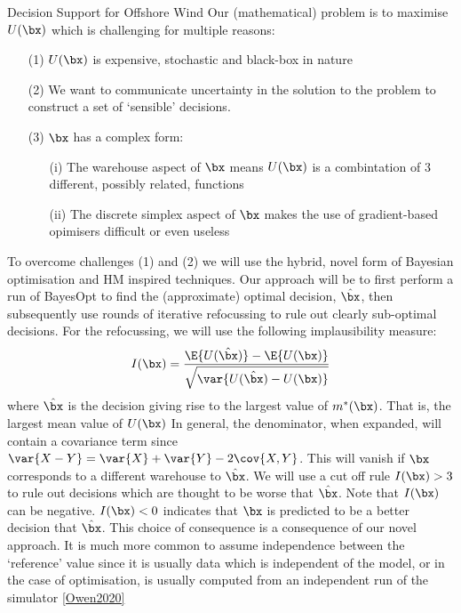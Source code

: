 \begin{chapter}{Decision Support for Offshore Wind \label{Ch:ds-for-ow}}
Our (mathematical) problem is to maximise $U(\bx)$ which is challenging for multiple reasons:
\begin{itemize}
  \item[(1)] $U(\bx)$ is expensive, stochastic and black-box in nature
  \item[(2)] We want to communicate uncertainty in the solution to the problem to construct a set of `sensible' decisions.
  \item[(3)] $\bx$ has a complex form:
  \begin{itemize}
    \item[(i)] The warehouse aspect of $\bx$ means $U(\bx)$ is a combintation of $3$ different, possibly related, functions
    \item[(ii)] The discrete simplex aspect of $\bx$ makes the use of gradient-based opimisers difficult or even useless
  \end{itemize}
\end{itemize}
To overcome challenges (1) and (2) we will use the hybrid, novel form of Bayesian optimisation and HM inspired techniques. Our approach will be to first perform a run of BayesOpt to find the (approximate) optimal decision, $\hat{\bx}$, then subsequently use rounds of iterative refocussing to rule out clearly sub-optimal decisions. For the refocussing, we will use the following implausibility measure:
\begin{equation}
  I(\bx) = \frac{\E\{ U(\hat{\bx}) \} - \E\{ U(\bx) \}}{\sqrt{\var \{U(\hat{\bx}) - U(\bx) \}}}
\end{equation}
where $\hat{\bx}$ is the decision giving rise to the largest value of $m^{*}(\bx)$.  That is, the largest mean value of $U(\bx)$ In general, the denominator, when expanded, will contain a covariance term since $\var\{X - Y\} = \var\{X\} + \var\{Y\} - 2 \cov \{X, Y\}$. This will vanish if $\bx$ corresponds to a different warehouse to $\hat{\bx}$. We will use a cut off rule $I(\bx) >  3$ to rule out decisions which are thought to be worse that $\hat{\bx}$. Note that $I(\bx)$ can be negative. $I(\bx) < 0$ indicates that $\bx$ is predicted to be a better decision that $\hat{\bx}$. This choice of consequence is a consequence of our novel approach. It is much more common to assume independence between the `reference' value since it is usually data which is independent of the model, or in the case of optimisation, is usually computed from an independent run of the simulator \cref{Owen2020}


\end{chapter}
